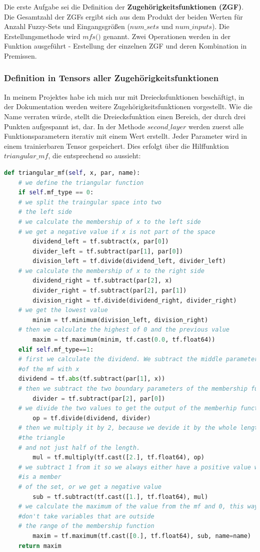 Die erste Aufgabe sei die Definition der
\textbf{Zugehörigkeitsfunktionen (ZGF)}. Die Gesamtzahl der ZGFs ergibt
sich aus dem Produkt der beiden Werten für Anzahl Fuzzy-Sets und
Eingangsgrößen (\(\textit{num\_sets}\) und \(\textit{num\_inputs}\)). Die
Erstellungsmethode wird \(\textit{mfs()}\) genannt. Zwei Operationen
werden in der Funktion ausgeführt - Erstellung der einzelnen ZGF und
deren Kombination in Premissen.

\subsubsection{Definition in Tensors aller Zugehörigkeitsfunktionen}\label{definition-in-tensors-aller-zugehuxf6rigkeitsfunktionen}

In meinem Projektes habe ich mich nur mit Dreiecksfunktionen
beschäftigt, in der Dokumentation werden weitere
Zugehörigkeitsfunktionen vorgestellt. Wie die Name verraten würde,
stellt die Dreiecksfunktion einen Bereich, der durch drei Punkten
aufgespannt ist, dar. In der Methode \(\textit{second\_layer}\) werden
zuerst alle Funktionsparametern iterativ mit einem Wert erstellt. Jeder
Parameter wird in einem trainierbaren Tensor gespeichert. Dies erfolgt
über die Hilffunktion \(\textit{triangular\_mf}\), die entsprechend so
aussieht:
\begin{lstlisting}[language=Python]
def triangular_mf(self, x, par, name):
	# we define the triangular function
	if self.mf_type == 0:
	# we split the traingular space into two
	# the left side
	# we calculate the membership of x to the left side
	# we get a negative value if x is not part of the space
		dividend_left = tf.subtract(x, par[0])
		divider_left = tf.subtract(par[1], par[0])
		division_left = tf.divide(dividend_left, divider_left)
	# we calculate the membership of x to the right side
		dividend_right = tf.subtract(par[2], x)
		divider_right = tf.subtract(par[2], par[1])
		division_right = tf.divide(dividend_right, divider_right)
	# we get the lowest value
		minim = tf.minimum(division_left, division_right)
	# then we calculate the highest of 0 and the previous value
		maxim = tf.maximum(minim, tf.cast(0.0, tf.float64))
	elif self.mf_type==1:
	# first we calculate the dividend. We subtract the middle parameter 
	#of the mf with x
	dividend = tf.abs(tf.subtract(par[1], x))
	# then we subtract the two boundary parameters of the membership function
		divider = tf.subtract(par[2], par[0])
	# we divide the two values to get the output of the memberhip function
		op = tf.divide(dividend, divider)
	# then we multiply it by 2, because we devide it by the whole length of
	#the triangle
	# and not just half of the length.
		mul = tf.multiply(tf.cast([2.], tf.float64), op)
	# we subtract 1 from it so we always either have a positive value when x
	#is a member
	# of the set, or we get a negative value
		sub = tf.subtract(tf.cast([1.], tf.float64), mul)
	# we calculate the maximum of the value from the mf and 0, this way we
	#don't take variables that are outside
	# the range of the membership function
		maxim = tf.maximum(tf.cast([0.], tf.float64), sub, name=name)
	return maxim

\end{lstlisting}

